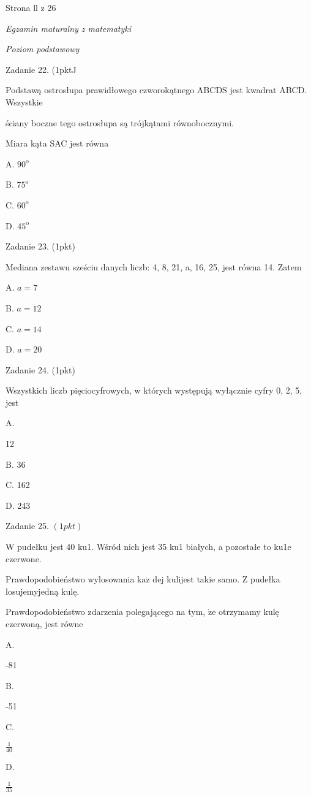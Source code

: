 \documentclass[a4paper,12pt]{article}
\begin{document}
Strona ll z 26





{\it Egzamin maturalny z matematyki}

{\it Poziom podstawowy}

Zadanie 22. (1pktJ

Podstawą ostrosłupa prawidłowego czworokątnego ABCDS jest kwadrat ABCD. Wszystkie

ściany boczne tego ostrosłupa są trójkątami równobocznymi.

Miara kąta SAC jest równa

A. $90^{\mathrm{o}}$

B. $75^{\mathrm{o}}$

C. $60^{\mathrm{o}}$

D. $45^{\mathrm{o}}$

Zadanie 23. (1pkt)

Mediana zestawu sześciu danych liczb: 4, 8, 21, a, 16, 25, jest równa 14. Zatem

A. $a=7$

B. $a=12$

C. $a=14$

D. $a=20$

Zadanie 24. (1pkt)

Wszystkich liczb pięciocyfrowych, w których występują wyłącznie cyfry 0, 2, 5, jest

A.

12

B. 36

C. 162

D. 243

Zadanie 25. $(1pkt)$

$\mathrm{W}$ pudełku jest 40 ku1. Wśród nich jest 35 ku1 białych, a pozostałe to ku1e czerwone.

Prawdopodobieństwo wylosowania $\mathrm{k}\mathrm{a}\dot{\mathrm{z}}$ dej kulijest takie samo. $\mathrm{Z}$ pudełka losujemyjedną kulę.

Prawdopodobieństwo zdarzenia polegającego na tym, $\dot{\mathrm{z}}\mathrm{e}$ otrzymamy kulę czerwoną, jest równe

A.

-81

B.

-51

C.

$\displaystyle \frac{1}{40}$

D.

$\displaystyle \frac{1}{35}$
\end{document}

